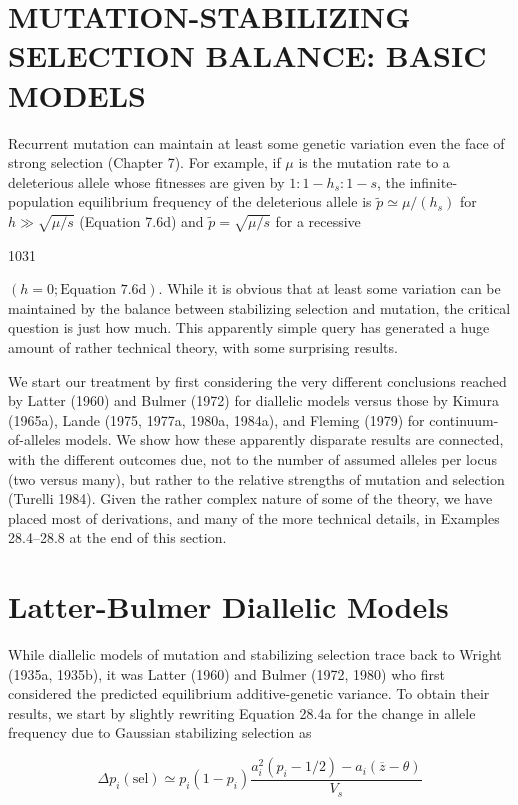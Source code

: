 \documentclass{article}
\begin{document}
\section{MUTATION-STABILIZING SELECTION BALANCE: BASIC MODELS}
Recurrent mutation can maintain at least some genetic variation even the face of strong selection (Chapter 7). For example, if  $ \mu $ is the mutation rate to a deleterious allele whose fitnesses are given by  $ 1:1 - h_s:1 - s $, the infinite-population equilibrium frequency of the deleterious allele is  $ \widetilde{p} \simeq \mu / (h_s) $ for  $ h \gg \sqrt{\mu / s} $ (Equation 7.6d) and  $ \widetilde{p} = \sqrt{\mu / s} $ for a recessive

1031

 $ (h = 0; \text{Equation 7.6d}) $. While it is obvious that at least some variation can be maintained by the balance between stabilizing selection and mutation, the critical question is just how much. This apparently simple query has generated a huge amount of rather technical theory, with some surprising results.

We start our treatment by first considering the very different conclusions reached by Latter (1960) and Bulmer (1972) for diallelic models versus those by Kimura (1965a), Lande (1975, 1977a, 1980a, 1984a), and Fleming (1979) for continuum-of-alleles models. We show how these apparently disparate results are connected, with the different outcomes due, not to the number of assumed alleles per locus (two versus many), but rather to the relative strengths of mutation and selection (Turelli 1984). Given the rather complex nature of some of the theory, we have placed most of derivations, and many of the more technical details, in Examples 28.4–28.8 at the end of this section.

\section{Latter-Bulmer Diallelic Models}
While diallelic models of mutation and stabilizing selection trace back to Wright (1935a, 1935b), it was Latter (1960) and Bulmer (1972, 1980) who first considered the predicted equilibrium additive-genetic variance. To obtain their results, we start by slightly rewriting Equation 28.4a for the change in allele frequency due to Gaussian stabilizing selection as

\begin{equation}
\Delta p_{i}(\mathrm{sel})\simeq p_{i}(1-p_{i})\frac{a_{i}^{2}(p_{i}-1/2)-a_{i}(\overline{z}-\theta)}{V_{s}}
\tag{28.11a}
\label{eq:28_11a}
\end{equation}
\end{document}
